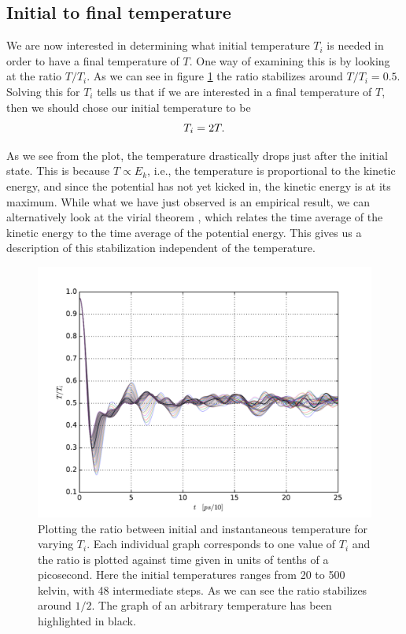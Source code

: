 \documentclass[a4paper]{article}
\begin{document}
\subsection{Initial to final temperature}
\label{sub:initial_to_final_temperature}

    We are now interested in determining what initial temperature $T_i$ is needed
    in order to have a final temperature of $T$.  One way of examining this is by
    looking at the ratio $T/T_i$. As we can see in figure \ref{fig:temperature_ratio} the
    ratio stabilizes around $T/T_i = 0.5$. Solving this for $T_i$ tells us that if
    we are interested in a final temperature of $T$, then we should chose our
    initial temperature to be
    \begin{equation}
        \notag
        T_i = 2T.
    \end{equation}

    As we see from the plot, the temperature drastically drops just after the
    initial state. This is because $T \propto E_k$, i.e., the temperature is
    proportional to the kinetic energy, and since the potential has not yet kicked
    in, the kinetic energy is at its maximum. While what we have just observed is
    an empirical result, we can alternatively look at the virial theorem
    \cite{virial}, which relates the time average of the kinetic energy to the time
    average of the potential energy. This gives us a description of this
    stabilization independent of the temperature. 

    \begin{figure}[h]
        \centering \includegraphics[width=0.8\linewidth]{temperature_ratio.pdf}
        \caption[Temperature ratio]{Plotting the ratio between initial and
            instantaneous temperature for varying $T_i$. Each individual graph
            corresponds to one value of $T_i$ and the ratio is plotted against
            time given in units of tenths of a picosecond. Here the initial
            temperatures ranges from 20 to 500 kelvin, with 48 intermediate
            steps.  As we can see the ratio stabilizes around $1/2$. The graph of
            an arbitrary temperature has been highlighted in black.}
        \label{fig:temperature_ratio}
    \end{figure}
\end{document}
